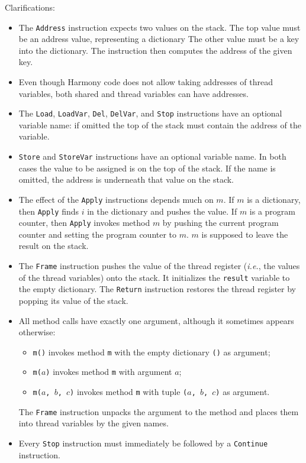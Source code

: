 \documentclass{report}
\begin{document}
\newpage
Clarifications:
\begin{itemize}
\item The \texttt{Address} instruction expects two values on the stack.
The top value must be an address value, representing a dictionary 
The other value must be a key into the dictionary.
The instruction then computes the address of the given key.
\item Even though Harmony code does not allow taking addresses of thread variables, both
shared and thread variables can have addresses.
\item The \texttt{Load}, \texttt{LoadVar}, \texttt{Del}, \texttt{DelVar},
and \texttt{Stop} instructions have an optional
variable name: if omitted the top of the stack must contain the address of
the variable.
\item \texttt{Store} and \texttt{StoreVar} instructions have an optional
variable name.  In both cases the value to be assigned is on the top
of the stack.  If the name is omitted, the address is underneath that
value on the stack.
\item The effect of the \texttt{Apply} instructions depends much on $m$.
If $m$ is a dictionary, then \texttt{Apply} finds $i$ in the dictionary
and pushes the value.
If $m$ is a program counter, then \texttt{Apply} invokes method $m$ by
pushing the current program counter and setting the program counter to
$m$.  $m$ is supposed to leave the result on the stack.
\item The \texttt{Frame} instruction pushes the value of the thread
register (\emph{i.e.}, the values of the thread variables) onto the
stack.  It initializes the \texttt{result} variable to the empty dictionary.
The \texttt{Return} instruction restores the thread register by popping
its value of the stack.
\item All method calls have exactly one argument, although it sometimes
appears otherwise:
\begin{itemize}
\item \texttt{m()} invokes method \texttt{m} with the empty dictionary \texttt{()} as argument;
\item \texttt{m($a$)} invokes method \texttt{m} with argument $a$;
\item \texttt{m($a$, $b$, $c$)} invokes method \texttt{m} with tuple \texttt{($a$, $b$, $c$)} as argument.
\end{itemize}
The \texttt{Frame} instruction unpacks the argument to the method and places them into thread variables by the given names.
\item Every \texttt{Stop} instruction must immediately be followed by a 
\texttt{Continue} instruction.
\end{itemize}
\end{document}
